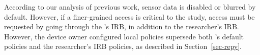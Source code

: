 According to our analysis of previous work, sensor data is disabled or 
blurred by default. However, if a finer-grained access is critical to the study, access 
must be requested by going through the \sysname's IRB, in addition to the 
researcher's IRB. However, the device owner configured local policies 
supersede both \sysname's default policies and the researcher's IRB policies, 
as described in Section~\ref{sec-repy}.

